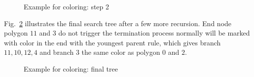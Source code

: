     \begin{figure}[h!]
        \centering
        \caption{Example for coloring: step 2}
        \label{qdt_fig:qdt_color_tree_1}
    \end{figure}
Fig.~\ref{qdt_fig:qdt_color_tree_2} illustrates the final search tree after a few more recursion.
End node polygon $11$ and $3$ do not trigger the termination process normally will be marked with color in the end with the youngest parent rule, which gives branch $11,10,12,4$ and branch $3$ the same color as polygon $0$ and $2$.
    \begin{figure}[h!]
        \centering
        \caption{Example for coloring: final tree}
        \label{qdt_fig:qdt_color_tree_2}
    \end{figure}

